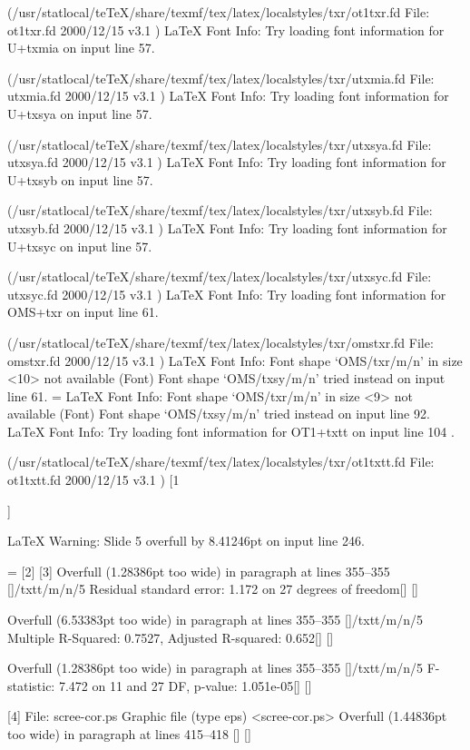 (/usr/statlocal/teTeX/share/texmf/tex/latex/localstyles/txr/ot1txr.fd
File: ot1txr.fd 2000/12/15 v3.1
)
LaTeX Font Info:    Try loading font information for U+txmia on input line 57.

(/usr/statlocal/teTeX/share/texmf/tex/latex/localstyles/txr/utxmia.fd
File: utxmia.fd 2000/12/15 v3.1
)
LaTeX Font Info:    Try loading font information for U+txsya on input line 57.

(/usr/statlocal/teTeX/share/texmf/tex/latex/localstyles/txr/utxsya.fd
File: utxsya.fd 2000/12/15 v3.1
)
LaTeX Font Info:    Try loading font information for U+txsyb on input line 57.

(/usr/statlocal/teTeX/share/texmf/tex/latex/localstyles/txr/utxsyb.fd
File: utxsyb.fd 2000/12/15 v3.1
)
LaTeX Font Info:    Try loading font information for U+txsyc on input line 57.

(/usr/statlocal/teTeX/share/texmf/tex/latex/localstyles/txr/utxsyc.fd
File: utxsyc.fd 2000/12/15 v3.1
)
LaTeX Font Info:    Try loading font information for OMS+txr on input line 61.

(/usr/statlocal/teTeX/share/texmf/tex/latex/localstyles/txr/omstxr.fd
File: omstxr.fd 2000/12/15 v3.1
)
LaTeX Font Info:    Font shape `OMS/txr/m/n' in size <10> not available
(Font)              Font shape `OMS/txsy/m/n' tried instead on input line 61.
=
LaTeX Font Info:    Font shape `OMS/txr/m/n' in size <9> not available
(Font)              Font shape `OMS/txsy/m/n' tried instead on input line 92.
LaTeX Font Info:    Try loading font information for OT1+txtt on input line 104
.

(/usr/statlocal/teTeX/share/texmf/tex/latex/localstyles/txr/ot1txtt.fd
File: ot1txtt.fd 2000/12/15 v3.1
)
[1

]

LaTeX Warning: Slide 5 overfull by 8.41246pt on input line 246.

=
[2] [3]
Overfull \hbox (1.28386pt too wide) in paragraph at lines 355--355
[]/txtt/m/n/5 Residual standard error: 1.172 on 27 degrees of freedom[]
 []


Overfull \hbox (6.53383pt too wide) in paragraph at lines 355--355
[]/txtt/m/n/5 Multiple R-Squared: 0.7527,     Adjusted R-squared: 0.652[]
 []


Overfull \hbox (1.28386pt too wide) in paragraph at lines 355--355
[]/txtt/m/n/5 F-statistic: 7.472 on 11 and 27 DF,  p-value: 1.051e-05[]
 []

[4]
File: scree-cor.ps Graphic file (type eps)
 <scree-cor.ps>
Overfull \hbox (1.44836pt too wide) in paragraph at lines 415--418
[]
 []


